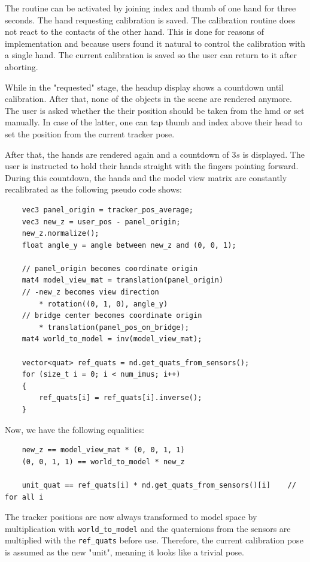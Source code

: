 \documentclass[hyperref, bachelorofscience]{cgvpub}
\begin{document}
The routine can be activated by joining index and thumb of one hand for three seconds. The hand requesting calibration is saved. The calibration routine does not react to the contacts of the other hand. This is done for reasons of implementation and because users found it natural to control the calibration with a single hand. The current calibration is saved so the user can return to it after aborting. 

While in the "requested" stage, the headup display shows a countdown until calibration. After that, none of the objects in the scene are rendered anymore. The user is asked whether the their position should be taken from the \acrshort{hmd} or set manually. In case of the latter, one can tap thumb and index above their head to set the position from the current tracker pose.

After that, the hands are rendered again and a countdown of $ 3s $ is displayed. The user is instructed to hold their hands straight with the fingers pointing forward. During this countdown, the hands and the model view matrix are constantly recalibrated as the following pseudo code shows:

\begin{lstlisting}
	vec3 panel_origin = tracker_pos_average;
	vec3 new_z = user_pos - panel_origin;
	new_z.normalize();
	float angle_y = angle between new_z and (0, 0, 1);
	
	// panel_origin becomes coordinate origin
	mat4 model_view_mat = translation(panel_origin)
	// -new_z becomes view direction
		* rotation((0, 1, 0), angle_y)
	// bridge center becomes coordinate origin
		* translation(panel_pos_on_bridge);
	mat4 world_to_model = inv(model_view_mat);
	
	vector<quat> ref_quats = nd.get_quats_from_sensors();
	for (size_t i = 0; i < num_imus; i++)
	{
		ref_quats[i] = ref_quats[i].inverse();
	}
\end{lstlisting}

Now, we have the following equalities:

\begin{lstlisting}
	new_z == model_view_mat * (0, 0, 1, 1)
	(0, 0, 1, 1) == world_to_model * new_z
	
	unit_quat == ref_quats[i] * nd.get_quats_from_sensors()[i]    // for all i
\end{lstlisting}

The tracker positions are now always transformed to model space by multiplication with \lstinline|world_to_model| and the quaternions from the sensors are multiplied with the \lstinline|ref_quats| before use. Therefore, the current calibration pose is assumed as the new "unit", meaning it looks like a trivial pose. 
\end{document}
